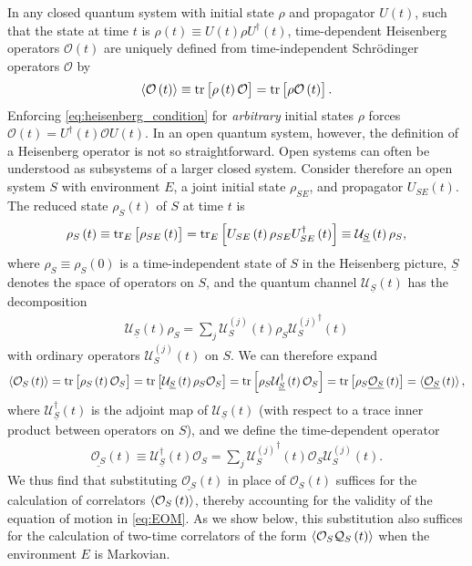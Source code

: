 \documentclass[aps,pra,twocolumn,longbibliography]{revtex4-2}
\newcommand{\p}[1]{\left( #1 \right)} %
\renewcommand{\sp}[1]{\left[ #1 \right]} %
\newcommand{\bk}{\braket} %
\newcommand{\ul}{\underline} %
\renewcommand{\O}{\mathcal{O}}
\newcommand{\Q}{\mathcal{Q}}
\newcommand{\U}{\mathcal{U}}
\newcommand{\1}{\mathds{1}}
\begin{document}
In any closed quantum system with initial state $\rho$ and propagator
$U\p{t}$, such that the state at time $t$ is
$\rho\p{t}\equiv U\p{t}\rho U^\dag\p{t}$, time-dependent Heisenberg
operators $\O\p{t}$ are uniquely defined from time-independent
Schr\"odinger operators $\O$ by
\begin{align}
  \bk{\O\p{t}} \equiv \tr\sp{\rho\p{t}\O} = \tr\sp{\rho\O\p{t}}.
  \label{eq:heisenberg_condition}
\end{align}
Enforcing \eqref{eq:heisenberg_condition} for {\it arbitrary} initial
states $\rho$ forces $\O\p{t}=U^\dag\p{t}\O U\p{t}$.  In an open
quantum system, however, the definition of a Heisenberg operator is
not so straightforward.  Open systems can often be understood as
subsystems of a larger closed system.  Consider therefore an open
system $S$ with environment $E$, a joint initial state $\rho_{SE}$,
and propagator $U_{SE}\p{t}$.  The reduced state $\rho_S\p{t}$ of $S$
at time $t$ is
\begin{align}
  \rho_S\p{t}
  \equiv \tr_E\sp{\rho_{SE}\p{t}}
  = \tr_E\sp{U_{SE}\p{t} \rho_{SE} U_{SE}^\dag\p{t}}
  \equiv \U_{\ul S}\p{t} \rho_S,
  \label{eq:state_S}
\end{align}
where $\rho_S\equiv\rho_S\p{0}$ is a time-independent state of $S$ in
the Heisenberg picture, $\ul S$ denotes the space of operators on $S$,
and the quantum channel $\U_{\ul S}\p{t}$ has the
decomposition\cite{rivas2012time}
\begin{align}
  \U_{\ul S}\p{t} \rho_S
  = \sum_j \U_S^{(j)}\p{t} \rho_S {\U_S^{(j)}}^\dag\p{t}
\end{align}
with ordinary operators $\U_S^{(j)}\p{t}$ on $S$.  We can therefore
expand
\begin{align}
  \bk{\O_S\p{t}}
  = \tr\sp{\rho_S\p{t}\O_S}
  = \tr\sp{\U_{\ul S}\p{t} \rho_S \O_S}
  = \tr\sp{\rho_S \U_{\ul S}^\dag\p{t} \O_S}
  = \tr\sp{\rho_S \ul{\O_S}\p{t}}
  = \bk{\ul{\O_S}\p{t}},
  \label{eq:heisenberg_correlator}
\end{align}
where $\U_{\ul S}^\dag\p{t}$ is the adjoint map of $\U_{\ul S}\p{t}$
(with respect to a trace inner product between operators on $S$), and
we define the time-dependent operator
\begin{align}
  \ul{\O_S}\p{t}
  \equiv \U_{\ul S}^\dag\p{t} \O_S
  = \sum_j {\U_S^{(j)}}^\dag\p{t} \O_S \U_S^{(j)}\p{t}.
  \label{eq:heisenberg_wrong}
\end{align}
We thus find that substituting $\ul{\O_S}\p{t}$ in place of
$\O_S\p{t}$ suffices for the calculation of correlators
$\bk{\O_S\p{t}}$, thereby accounting for the validity of the equation
of motion in \eqref{eq:EOM}.  As we show below, this substitution also
suffices for the calculation of two-time correlators of the form
$\bk{\O_S\Q_S\p{t}}$ when the environment $E$ is Markovian.
\end{document}
